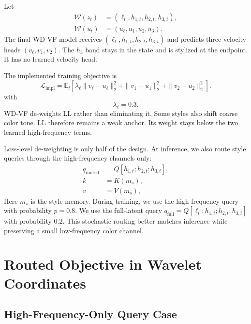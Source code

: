 \documentclass[letterpaper]{article}
\begin{document}
Let
\begin{equation}
\begin{aligned}
\mathcal W(z_t) &= (\ell_t,h_{1,t},h_{2,t},h_{3,t}),\\
\mathcal W(u_t) &= (u_\ell,u_1,u_2,u_3).
\end{aligned}
\end{equation}
The final WD-VF model receives $(\ell_t,h_{1,t},h_{2,t},h_{3,t})$ and predicts three velocity heads $(v_\ell,v_1,v_2)$.
The $h_3$ band stays in the state and is stylized at the endpoint.
It has no learned velocity head.

The implemented training objective is
\begin{equation}
\mathcal L_{\mathrm{impl}}
=
\mathbb E_t\!\left[
\lambda_\ell\|v_\ell-u_\ell\|_2^2
+ \|v_1-u_1\|_2^2
+ \|v_2-u_2\|_2^2
\right].
\label{eq:wdvf-loss}
\end{equation}
with
\begin{equation}
\lambda_\ell = 0.3.
\label{eq:lambda-ll}
\end{equation}
WD-VF de-weights LL rather than eliminating it.
Some styles also shift coarse color tone.
LL therefore remains a weak anchor.
Its weight stays below the two learned high-frequency terms.

Loss-level de-weighting is only half of the design. At inference, we also route style queries through the high-frequency channels only:
\begin{equation}
\begin{aligned}
q_{\mathrm{routed}} &= Q[h_{1,t};h_{2,t};h_{3,t}],\\
k &= K(m_s),\\
v &= V(m_s),
\end{aligned}
\label{eq:q-routed}
\end{equation}
Here $m_s$ is the style memory.
During training, we use the high-frequency query with probability $p=0.8$.
We use the full-latent query $q_{\mathrm{full}} = Q[\ell_t;h_{1,t};h_{2,t};h_{3,t}]$ with probability $0.2$.
This stochastic routing better matches inference while preserving a small low-frequency color channel.

\section{Routed Objective in Wavelet Coordinates}
\label{sec:opt}

\subsection{High-Frequency-Only Query Case}
\label{sec:blockdiag}
\end{document}
